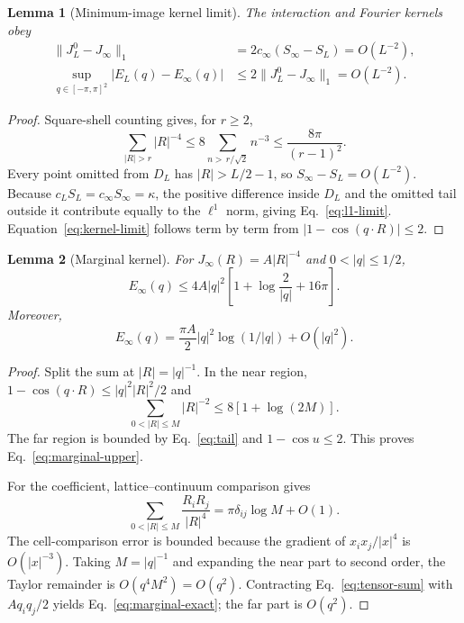 \documentclass[aps,prb,twocolumn,groupedaddress,amsmath,amssymb,
               superscriptaddress,nofootinbib,floatfix]{revtex4-2}
\theoremstyle{plain}
\newtheorem{lemma}{Lemma}
\theoremstyle{definition}
\begin{document}
\begin{lemma}[Minimum-image kernel limit]
\label{lem:MI-limit}
The interaction and Fourier kernels obey
\begin{align}
 \|J_L^0-J_\infty\|_1
 &=2c_\infty(S_\infty-S_L)=O(L^{-2}),
\label{eq:l1-limit}\\
 \sup_{q\in[-\pi,\pi]^2}|E_L(q)-E_\infty(q)|
 &\le2\|J_L^0-J_\infty\|_1=O(L^{-2}).
\label{eq:kernel-limit}
\end{align}
\end{lemma}

\begin{proof}
Square-shell counting gives, for $r\ge2$,
\begin{equation}
 \sum_{|R|>r}|R|^{-4}
 \le8\sum_{n>\,r/\sqrt2}n^{-3}
 \le\frac{8\pi}{(r-1)^2}.
\label{eq:tail}
\end{equation}
Every point omitted from $D_L$ has $|R|>L/2-1$, so
$S_\infty-S_L=O(L^{-2})$.  Because
$c_LS_L=c_\infty S_\infty=\kappa$, the positive difference inside $D_L$
and the omitted tail outside it contribute equally to the $\ell^1$ norm,
giving Eq.~\eqref{eq:l1-limit}.  Equation~\eqref{eq:kernel-limit} follows
term by term from $|1-\cos(q\cdot R)|\le2$.
\end{proof}

\begin{lemma}[Marginal kernel]
\label{lem:marginal}
For $J_\infty(R)=A|R|^{-4}$ and $0<|q|\le1/2$,
\begin{equation}
 E_\infty(q)
 \le
 4A|q|^2
 \left[1+\log\frac2{|q|}+16\pi\right].
\label{eq:marginal-upper}
\end{equation}
Moreover,
\begin{equation}
 E_\infty(q)
 =
 \frac{\pi A}{2}|q|^2\log(1/|q|)
 +O(|q|^2).
\label{eq:marginal-exact}
\end{equation}
\end{lemma}

\begin{proof}
Split the sum at $|R|=|q|^{-1}$.  In the near region,
$1-\cos(q\cdot R)\le|q|^2|R|^2/2$ and
\begin{equation}
 \sum_{0<|R|\le M}|R|^{-2}
 \le8[1+\log(2M)].
\end{equation}
The far region is bounded by Eq.~\eqref{eq:tail} and
$1-\cos u\le2$.  This proves Eq.~\eqref{eq:marginal-upper}.

For the coefficient, lattice--continuum comparison gives
\begin{equation}
 \sum_{0<|R|\le M}\frac{R_iR_j}{|R|^4}
 =
 \pi\delta_{ij}\log M+O(1).
\label{eq:tensor-sum}
\end{equation}
The cell-comparison error is bounded because the gradient of
$x_ix_j/|x|^4$ is $O(|x|^{-3})$.  Taking $M=|q|^{-1}$ and expanding the
near part to second order, the Taylor remainder is
$O(q^4M^2)=O(q^2)$.  Contracting Eq.~\eqref{eq:tensor-sum} with
$Aq_iq_j/2$ yields Eq.~\eqref{eq:marginal-exact}; the far part is
$O(q^2)$.
\end{proof}
\end{document}
